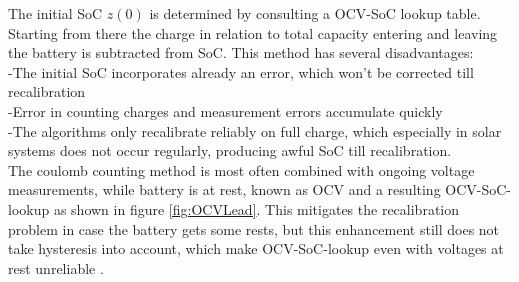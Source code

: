 The initial SoC $z(0)$ is determined by consulting a OCV-SoC lookup table. Starting from there the charge in relation to total capacity entering and leaving the battery is subtracted from SoC. This method has several disadvantages: \\

-The initial SoC incorporates already an error, which won't be corrected till recalibration \\
-Error in counting charges and measurement errors accumulate quickly\\
-The algorithms only recalibrate reliably on full charge, which especially in solar systems does not occur regularly, producing awful SoC till recalibration. \\ %

The coulomb counting method is most often combined with ongoing voltage measurements, while battery is at rest, known as OCV and a resulting OCV-SoC-lookup as shown in figure \ref{fig:OCVLead}. This mitigates the recalibration problem in case the battery gets some rests, but this enhancement still does not take hysteresis into account, which make OCV-SoC-lookup even with voltages at rest unreliable \cite{6861809} \cite{khan2016hysteresis}. %



